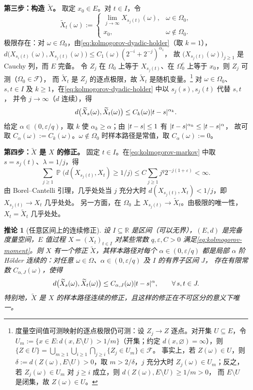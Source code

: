 \documentclass[UTF8,11pt,a4paper,oneside,fontset=fandol]{ctexrep}
\makeatletter
\numberwithin{equation}{section}
\theoremstyle{zhthm}
\newtheorem{corollary}[theorem]{推论}
\renewenvironment{proof}[1][\proofname]{\par
  \pushQED{\qed}%
  \normalfont\topsep6\p@\@plus6\p@\relax
  \trivlist
  \item[\hskip\labelsep\bfseries#1\hspace{0.5em}]\ignorespaces
}{%
  \popQED\endtrivlist\@endpefalse
}
\renewcommand{\proofname}{证明}
\newcommand{\R}{\mathbb{R}}
\newcommand{\F}{\mathcal{F}}
\DeclareMathOperator{\Prob}{\mathbb{P}}
\DeclarePairedDelimiter{\abs}{\lvert}{\rvert}
\makeatother
\begin{document}
\begin{proof}
\textbf{\boldmath 第三步：构造 $\widetilde X$。}
取定 $x_0\in E$。对 $t\in I$，令
\[
  \widetilde X_t(\omega):=
  \begin{cases}
    \lim_{j\to\infty}X_{s_j(t)}(\omega), & \omega\in\Omega_0,\\
    x_0, & \omega\notin\Omega_0.
  \end{cases}
\]
极限存在：对 $\omega\in\Omega_0$，由\cref{eq:kolmogorov-dyadic-holder}（取 $k=1$），
$d\bigl(X_{s_i(t)}(\omega),X_{s_j(t)}(\omega)\bigr)\le C_1(\omega)(2^{-i}+2^{-j})^{\alpha_1}$，
故 $\bigl(X_{s_j(t)}(\omega)\bigr)_{j\ge1}$ 是 Cauchy 列，而 $E$ 完备。
令 $Z_j$ 在 $\Omega_0$ 上等于 $X_{s_j(t)}$、在 $\Omega_0^c$ 上等于 $x_0$，则 $Z_j$ 可测（$\Omega_0\in\F$），
而 $\widetilde X_t$ 是 $Z_j$ 的逐点极限，故 $\widetilde X_t$ 是随机变量。\footnote{%
  度量空间值可测映射的逐点极限仍可测：设 $Z_j\to Z$ 逐点。对开集 $U\subseteq E$，令
  $U_m:=\{x\in E:d(x,E\setminus U)>1/m\}$（开集；约定 $d(x,\varnothing)=\infty$），则
  $\{Z\in U\}=\bigcup_{m\ge1}\bigcup_{i\ge1}\bigcap_{j\ge i}\{Z_j\in U_m\}\in\F$。
  事实上，若 $Z(\omega)\in U$，则 $\delta:=d(Z(\omega),E\setminus U)>0$，取 $m>2/\delta$，$j$ 充分大时
  $Z_j(\omega)\in U_m$；反之，若 $Z_j(\omega)\in U_m$ 对 $j\ge i$ 成立，则 $d(Z(\omega),E\setminus U)\ge1/m>0$，
  而 $E\setminus U$ 是闭集，故 $Z(\omega)\in U$。}
对 $\omega\in\Omega_0$、$s,t\in I$ 及 $k\ge1$，在\cref{eq:kolmogorov-dyadic-holder} 中以 $s_j(s),s_j(t)$ 代替 $s,t$，
并令 $j\to\infty$（$d$ 连续），得
\[
  d\bigl(\widetilde X_s(\omega),\widetilde X_t(\omega)\bigr)\le C_k(\omega)\abs{t-s}^{\alpha_k}.
\]
给定 $\alpha\in(0,\varepsilon/q)$，取 $k$ 使 $\alpha_k\ge\alpha$；由 $\abs{t-s}\le1$ 有 $\abs{t-s}^{\alpha_k}\le\abs{t-s}^\alpha$，
故可取 $C_\alpha(\omega):=C_k(\omega)$。$\omega\notin\Omega_0$ 时样本路径是常值，取 $C_\alpha(\omega):=0$。

\textbf{\boldmath 第四步：$\widetilde X$ 是 $X$ 的修正。}
固定 $t\in I$。在\cref{eq:kolmogorov-markov} 中取 $s=s_j(t)$、$\lambda=1/j$，得
\[
  \sum_{j\ge1}\Prob\bigl(d(X_{s_j(t)},X_t)\ge1/j\bigr)\le C\sum_{j\ge1}j^q2^{-j(1+\varepsilon)}<\infty.
\]
由 Borel--Cantelli 引理，几乎处处当 $j$ 充分大时 $d(X_{s_j(t)},X_t)<1/j$，即 $X_{s_j(t)}\to X_t$ 几乎处处。
另一方面，在 $\Omega_0$ 上 $X_{s_j(t)}\to\widetilde X_t$。由极限的唯一性，$X_t=\widetilde X_t$ 几乎处处。
\end{proof}

\begin{corollary}[任意区间上的连续修正]
\label{cor:kolmogorov-continuity-general}
设 $I\subseteq\R$ 是区间（可以无界），$(E,d)$ 是完备度量空间，$E$ 值过程 $X=(X_t)_{t\in I}$
对某些常数 $q,\varepsilon,C>0$ 满足\cref{eq:kolmogorov-moment}。则 $X$ 有一个修正 $\widetilde X$，其样本路径对每个 $\alpha\in(0,\varepsilon/q)$
都是局部 $\alpha$ 阶 Hölder 连续的：对任意 $\omega\in\Omega$、$\alpha\in(0,\varepsilon/q)$ 及 $I$ 的有界子区间 $J$，
存在有限常数 $C_{\alpha,J}(\omega)$，使得
\[
  d\bigl(\widetilde X_s(\omega),\widetilde X_t(\omega)\bigr)\le C_{\alpha,J}(\omega)\abs{t-s}^\alpha,\qquad\forall\,s,t\in J.
\]
特别地，$\widetilde X$ 是 $X$ 的样本路径连续的修正，且这样的修正在不可区分的意义下唯一。
\end{corollary}
\end{document}
